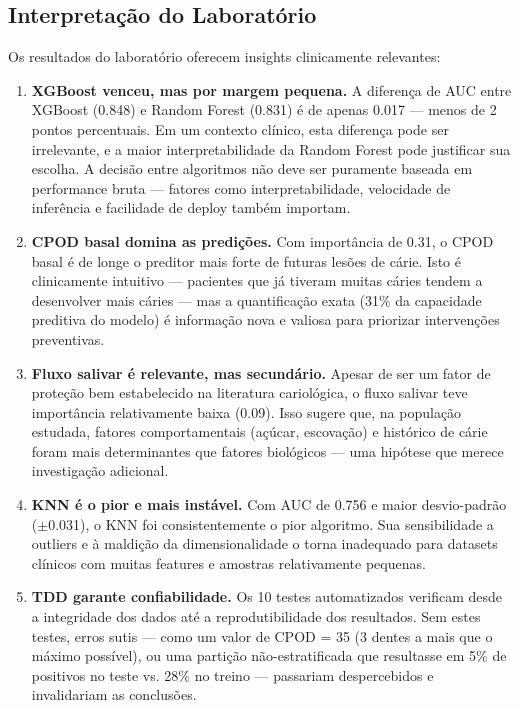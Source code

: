 \subsection{Interpretação do Laboratório}

Os resultados do laboratório oferecem insights clinicamente relevantes:

\begin{enumerate}
    \item \textbf{XGBoost venceu, mas por margem pequena.} A diferença de AUC entre XGBoost (0.848) e Random Forest (0.831) é de apenas 0.017 — menos de 2 pontos percentuais. Em um contexto clínico, esta diferença pode ser irrelevante, e a maior interpretabilidade da Random Forest pode justificar sua escolha. A decisão entre algoritmos não deve ser puramente baseada em performance bruta — fatores como interpretabilidade, velocidade de inferência e facilidade de deploy também importam.

    \item \textbf{CPOD basal domina as predições.} Com importância de 0.31, o CPOD basal é de longe o preditor mais forte de futuras lesões de cárie. Isto é clinicamente intuitivo — pacientes que já tiveram muitas cáries tendem a desenvolver mais cáries — mas a quantificação exata (31\% da capacidade preditiva do modelo) é informação nova e valiosa para priorizar intervenções preventivas.

    \item \textbf{Fluxo salivar é relevante, mas secundário.} Apesar de ser um fator de proteção bem estabelecido na literatura cariológica, o fluxo salivar teve importância relativamente baixa (0.09). Isso sugere que, na população estudada, fatores comportamentais (açúcar, escovação) e histórico de cárie foram mais determinantes que fatores biológicos — uma hipótese que merece investigação adicional.

    \item \textbf{KNN é o pior e mais instável.} Com AUC de 0.756 e maior desvio-padrão ($\pm$0.031), o KNN foi consistentemente o pior algoritmo. Sua sensibilidade a outliers e à maldição da dimensionalidade o torna inadequado para datasets clínicos com muitas features e amostras relativamente pequenas.

    \item \textbf{TDD garante confiabilidade.} Os 10 testes automatizados verificam desde a integridade dos dados até a reprodutibilidade dos resultados. Sem estes testes, erros sutis — como um valor de CPOD = 35 (3 dentes a mais que o máximo possível), ou uma partição não-estratificada que resultasse em 5\% de positivos no teste vs. 28\% no treino — passariam despercebidos e invalidariam as conclusões.
\end{enumerate}

